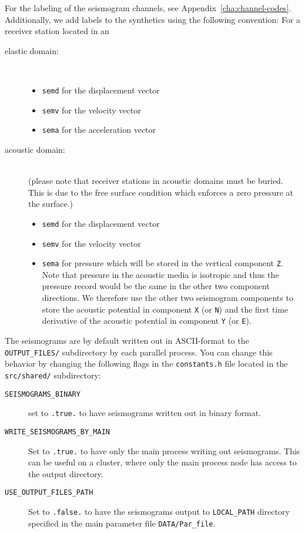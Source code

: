 For the labeling of the seismogram channels, see Appendix~\ref{cha:channel-codes}.
Additionally, we add labels to the synthetics using the following
convention: For a receiver station located in an
\begin{description}
\item [{elastic domain:}] ~
\begin{itemize}
\item \texttt{semd} for the displacement vector
\item \texttt{semv} for the velocity vector
\item \texttt{sema} for the acceleration vector
\end{itemize}
\item [{acoustic domain:}] ~\\
 (please note that receiver stations in acoustic domains must be buried.
This is due to the free surface condition which enforces a zero pressure
at the surface.)
\begin{itemize}
\item \texttt{semd} for the displacement vector
\item \texttt{semv} for the velocity vector
\item \texttt{sema} for pressure which will be stored in the vertical component
\texttt{Z}. Note that pressure in the acoustic media is isotropic
and thus the pressure record would be the same in the other two component
directions. We therefore use the other two seismogram components to
store the acoustic potential in component \texttt{X} (or \texttt{N})
and the first time derivative of the acoustic potential in component
\texttt{Y} (or \texttt{E}).
\end{itemize}
\end{description}
The seismograms are by default written out in ASCII-format to the
\texttt{OUTPUT\_FILES/} subdirectory by each parallel process. You
can change this behavior by changing the following flags in the \texttt{constants.h}
file located in the \texttt{src/shared/} subdirectory:
\begin{description}
\item [{\texttt{SEISMOGRAMS\_BINARY}}] set to \texttt{.true.} to have seismograms
written out in binary format.
\item [{\texttt{WRITE\_SEISMOGRAMS\_BY\_MAIN}}] Set to \texttt{.true.}
to have only the main process writing out seismograms. This can
be useful on a cluster, where only the main process node has access
to the output directory.
\item [{\texttt{USE\_OUTPUT\_FILES\_PATH}}] Set to \texttt{.false.} to
have the seismograms output to \texttt{LOCAL\_PATH} directory specified
in the main parameter file \texttt{DATA/Par\_file}.
\end{description}

